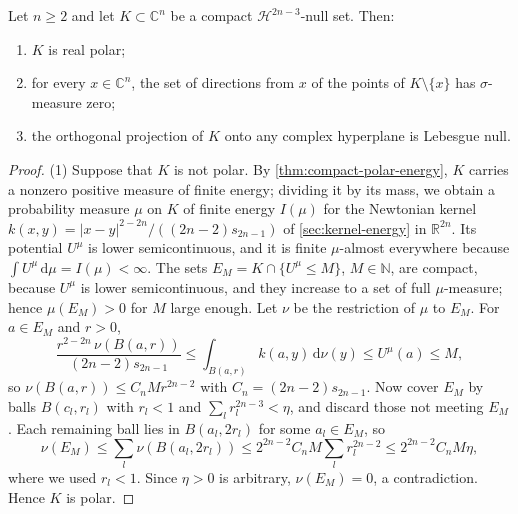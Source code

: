 \begin{lemma}\label{lem:small-set-polar-directions}
Let $n\ge2$ and let $K\subset\mathbb{C}^n$ be a compact $\mathcal H^{2n-3}$-null set. Then:
\begin{enumerate}
\item $K$ is real polar;
\item for every $x\in\mathbb{C}^n$, the set of directions from $x$ of the points of $K\setminus\{x\}$ has $\sigma$-measure zero;
\item the orthogonal projection of $K$ onto any complex hyperplane is Lebesgue null.
\end{enumerate}
\end{lemma}
\begin{proof}
(1) Suppose that $K$ is not polar. By \cref{thm:compact-polar-energy}, $K$ carries a nonzero positive measure of finite energy; dividing it by its mass, we obtain a probability measure $\mu$ on $K$ of finite energy $I(\mu)$ for the Newtonian kernel $k(x,y)=|x-y|^{2-2n}/((2n-2)s_{2n-1})$ of \cref{sec:kernel-energy} in $\mathbb R^{2n}$. Its potential $U^\mu$ is lower semicontinuous, and it is finite $\mu$-almost everywhere because $\int U^\mu\,\mathrm d\mu=I(\mu)<\infty$. The sets $E_M=K\cap\{U^\mu\le M\}$, $M\in\mathbb N$, are compact, because $U^\mu$ is lower semicontinuous, and they increase to a set of full $\mu$-measure; hence $\mu(E_M)>0$ for $M$ large enough. Let $\nu$ be the restriction of $\mu$ to $E_M$. For $a\in E_M$ and $r>0$,
\[
 \frac{r^{2-2n}\,\nu(B(a,r))}{(2n-2)s_{2n-1}}\leq\int_{B(a,r)}k(a,y)\,\mathrm d\nu(y)\leq U^\mu(a)\leq M,
\]
so $\nu(B(a,r))\le C_nMr^{2n-2}$ with $C_n=(2n-2)s_{2n-1}$. Now cover $E_M$ by balls $B(c_l,r_l)$ with $r_l<1$ and $\sum_lr_l^{2n-3}<\eta$, and discard those not meeting $E_M$. Each remaining ball lies in $B(a_l,2r_l)$ for some $a_l\in E_M$, so
\[
 \nu(E_M)\leq\sum_l\nu(B(a_l,2r_l))\leq2^{2n-2}C_nM\sum_lr_l^{2n-2}\leq2^{2n-2}C_nM\eta,
\]
where we used $r_l<1$. Since $\eta>0$ is arbitrary, $\nu(E_M)=0$, a contradiction. Hence $K$ is polar.


\end{proof}
